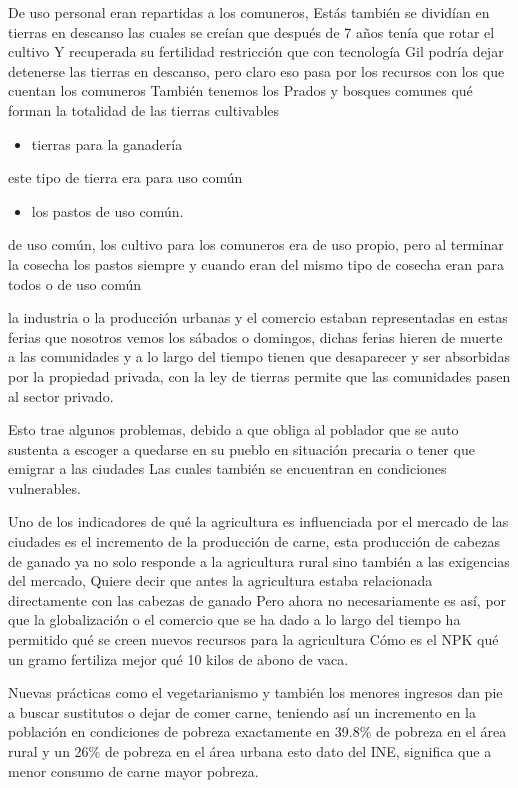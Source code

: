 \documentclass[
  a4paper,
]{article}
\providecommand{\tightlist}{%
  \setlength{\itemsep}{0pt}\setlength{\parskip}{0pt}}\usepackage{longtable,booktabs,array}
\begin{document}
De uso personal eran repartidas a los comuneros, Estás también se
dividían en tierras en descanso las cuales se creían que después de 7
años tenía que rotar el cultivo Y recuperada su fertilidad restricción
que con tecnología Gil podría dejar detenerse las tierras en descanso,
pero claro eso pasa por los recursos con los que cuentan los comuneros
También tenemos los Prados y bosques comunes qué forman la totalidad de
las tierras cultivables

\begin{itemize}
\tightlist
\item
  tierras para la ganadería
\end{itemize}

este tipo de tierra era para uso común

\begin{itemize}
\tightlist
\item
  los pastos de uso común.
\end{itemize}

de uso común, los cultivo para los comuneros era de uso propio, pero al
terminar la cosecha los pastos siempre y cuando eran del mismo tipo de
cosecha eran para todos o de uso común

la industria o la producción urbanas y el comercio estaban representadas
en estas ferias que nosotros vemos los sábados o domingos, dichas ferias
hieren de muerte a las comunidades y a lo largo del tiempo tienen que
desaparecer y ser absorbidas por la propiedad privada, con la ley de
tierras permite que las comunidades pasen al sector privado.

Esto trae algunos problemas, debido a que obliga al poblador que se auto
sustenta a escoger a quedarse en su pueblo en situación precaria o tener
que emigrar a las ciudades Las cuales también se encuentran en
condiciones vulnerables.

Uno de los indicadores de qué la agricultura es influenciada por el
mercado de las ciudades es el incremento de la producción de carne, esta
producción de cabezas de ganado ya no solo responde a la agricultura
rural sino también a las exigencias del mercado, Quiere decir que antes
la agricultura estaba relacionada directamente con las cabezas de ganado
Pero ahora no necesariamente es así, por que la globalización o el
comercio que se ha dado a lo largo del tiempo ha permitido qué se creen
nuevos recursos para la agricultura Cómo es el NPK qué un gramo
fertiliza mejor qué 10 kilos de abono de vaca.

Nuevas prácticas como el vegetarianismo y también los menores ingresos
dan pie a buscar sustitutos o dejar de comer carne, teniendo así un
incremento en la población en condiciones de pobreza exactamente en
39.8\% de pobreza en el área rural y un 26\% de pobreza en el área
urbana esto dato del INE, significa que a menor consumo de carne mayor
pobreza.
\end{document}
